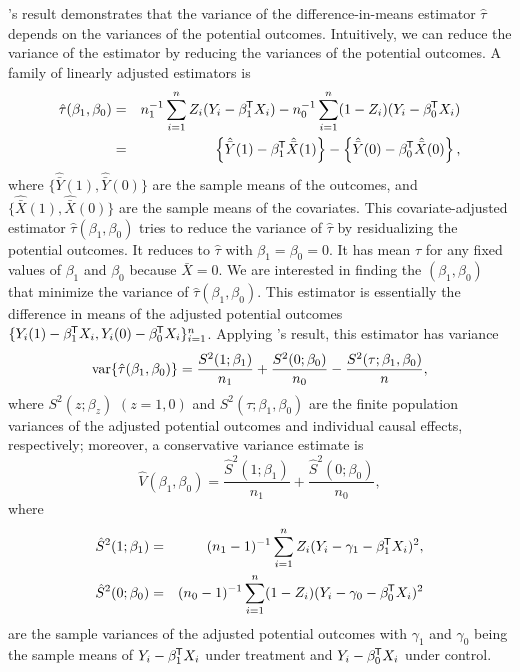 \citet{Neyman:1923}'s result demonstrates that the variance of the difference-in-means estimator $\hat{\tau}$ depends on the variances of the potential outcomes. Intuitively, we can reduce the variance of the estimator by reducing the variances of the potential outcomes. A family of linearly adjusted estimators is
\begin{eqnarray} 
\hat{\tau}(\beta_1, \beta_0) &=& n_1^{-1} \sumn Z_i(Y_i - \beta_1\tran X_i) - n_0^{-1} \sumn (1-Z_i) (Y_i - \beta_0\tran X_i)  \label{eq::linear-adj-1}\\
&=& \left\{  \hat{\bar{Y}}(1) - \beta_1\tran \hat{\bar{X} }(1) \right\}  -  \left\{   \hat{\bar{Y}}(0) - \beta_0\tran \hat{\bar{X} }(0) \right\},
\label{eq::linear-adj-2}
\end{eqnarray}
where $\{ \hat{\bar{Y}}(1), \hat{\bar{Y}}(0) \}$ are the sample means of the outcomes, and $\{ \hat{\bar{X} }(1), \hat{\bar{X} }(0)\}$ are the sample means of the covariates. This covariate-adjusted estimator $\hat{\tau}(\beta_1, \beta_0)$ tries to reduce the variance of $\hat\tau$ by residualizing the potential outcomes. It reduces to $\hat\tau$ with $\beta_1 = \beta_0 = 0$. 
It has mean $\tau$ for any fixed values of $\beta_1$ and $\beta_0$ because $\bar{X}  = 0.$ We are interested in finding the $(\beta_1, \beta_0)$ that minimize the variance of $\hat{\tau}(\beta_1, \beta_0)$. This estimator is essentially the difference in means of the adjusted potential outcomes $\{ Y_i(1) - \beta_1^{\mkern-1.5mu\mathsf{T}} X_i  , Y_i(0) - \beta_0^{\mkern-1.5mu\mathsf{T}}  X_i \}_{i=1}^n $. Applying \citet{Neyman:1923}'s result, this estimator has variance
$$
\textup{var}\{ \hat{\tau}(\beta_1, \beta_0) \} = \frac{ {S}^2(1; \beta_1) }{ n_1 } + \frac{ {S}^2(0; \beta_0) }{ n_0 }
- \frac{  S^2(\tau; \beta_1, \beta_0)  }{ n },
$$
where $ {S}^2(z; \beta_z)$ $(z=1,0)$ and $S^2(\tau; \beta_1, \beta_0)$ are the finite population variances of the adjusted potential outcomes and individual causal effects, respectively; moreover,  a conservative variance estimate is 
$$
\hat{V}( \beta_1, \beta_0 ) = \frac{ \hat{S}^2(1; \beta_1) }{ n_1 } + \frac{ \hat{S}^2(0; \beta_0) }{ n_0 },
$$
where 
\begin{eqnarray*}
\hat{S}^2(1; \beta_1) &=& (n_1-1)^{-1} \sum_{i=1}^n Z_i  ( Y_i - \gamma_1 - \beta_1^{\mkern-1.5mu\mathsf{T}}  X_i )^2,\\ 
\hat{S}^2(0; \beta_0) &=& (n_0-1)^{-1} \sum_{i=1}^n (1-Z_i)  ( Y_i - \gamma_0 - \beta_0^{\mkern-1.5mu\mathsf{T}}  X_i )^2
\end{eqnarray*}
are the sample variances of the adjusted potential outcomes with $\gamma_1$ and $\gamma_0$ being the sample means of  $Y_i - \beta_1^{\mkern-1.5mu\mathsf{T}}  X_i$ under treatment and $Y_i   - \beta_0^{\mkern-1.5mu\mathsf{T}}  X_i $ under control. 
